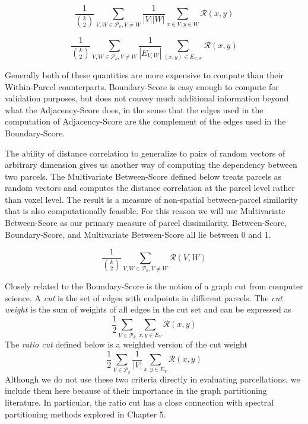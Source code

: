 \begin{definition} \label{between-score}
\[ \frac{1}{\binom{k}{2}} \sum_{V, W \in \mathcal{P}_k, V \neq W}
   \frac{1}{|V||W|} \sum_{x \in V, y \in W} \mathcal{R}(x,y)
\]
\end{definition}

\begin{definition} \label{boundary-score}
\[ \frac{1}{\binom{k}{2}} \sum_{V, W \in \mathcal{P}_k, V \neq W}
   \frac{1}{|E_{V,W}|} \sum_{(x,y) \in E_{V,W}} \mathcal{R}(x,y)
\]
\end{definition}

Generally both of these quantities are more expensive to compute than
their Within-Parcel counterparts. Boundary-Score is easy enough to
compute for validation purposes, but does not convey much additional
information beyond what the Adjacency-Score does, in the sense that
the edges used in the computation of Adjacency-Score are the complement
of the edges used in the Boundary-Score.

The ability of distance correlation to generalize to pairs of random
vectors of arbitrary dimension gives us another way of computing
the dependency between two parcels. The Multivariate Between-Score
defined below treats parcels as random vectors and computes the distance
correlation at the parcel level rather than voxel level. The result is
a measure of non-spatial between-parcel similarity that is also
computationally feasible. For this reason we will use Multivariate
Between-Score as our primary measure of parcel dissimilarity.
Between-Score, Boundary-Score, and Multivariate Between-Score all
lie between 0 and 1.

\begin{definition}
\label{multi-between-score}
\[ \frac{1}{\binom{k}{2}} \sum_{V, W \in \mathcal{P}_k, V \neq W}
   \mathcal{R}(V, W)
\]
\end{definition}

Closely related to the Boundary-Score is the notion of a graph cut from
computer science. A \textit{cut} is the set of edges with endpoints
in different parcels. The \textit{cut weight} is the sum of weights of
all edges in the cut set and can be expressed as
\[ \frac{1}{2} \sum_{V \in \mathcal{P}_k}
   \sum_{x,y \in E_V} \mathcal{R}(x,y) \]
The \textit{ratio cut} defined below is a weighted version of the cut
weight
\[ \frac{1}{2} \sum_{V \in \mathcal{P}_k} \frac{1}{|V|}
   \sum_{x,y \in E_V} \mathcal{R}(x,y)
\]
Although we do not use these two criteria directly in evaluating
parcellations, we include them here because of their importance in
the graph partitioning literature. In particular, the ratio cut has
a close connection with spectral partitioning methods explored in
Chapter 5.

